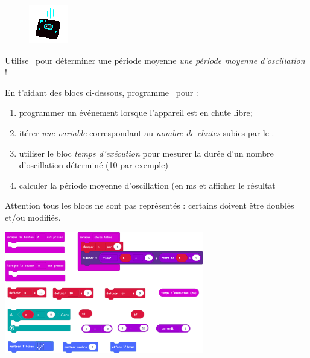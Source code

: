 \begin{figure}
    \includegraphics[width=\linewidth]{res/mbChutes.png}
\end{figure}
\begin{eleve}
Utilise \mb~pour déterminer une période moyenne \emph{une période moyenne d'oscillation} !

En t'aidant des blocs ci-dessous, programme \mb~pour : 
\begin{enumerate}
    \item programmer un événement lorsque l'appareil est en chute libre;
    \item itérer \emph{une variable} correspondant au \emph{nombre de chutes} subies par le \mb.
    \item utiliser le bloc \emph{temps d'exécution} pour mesurer la durée d'un nombre d'oscillation déterminé (10 par exemple)
    \item calculer la période moyenne d'oscillation (en ms et afficher le résultat
\end{enumerate}
Attention tous les blocs ne sont pas représentés : certains doivent être doublés et/ou modifiés.

\begin{center}
    \includegraphics[width=0.65\textwidth]{res/mbChutesN2blocs.png}
\end{center}

\end{eleve}

